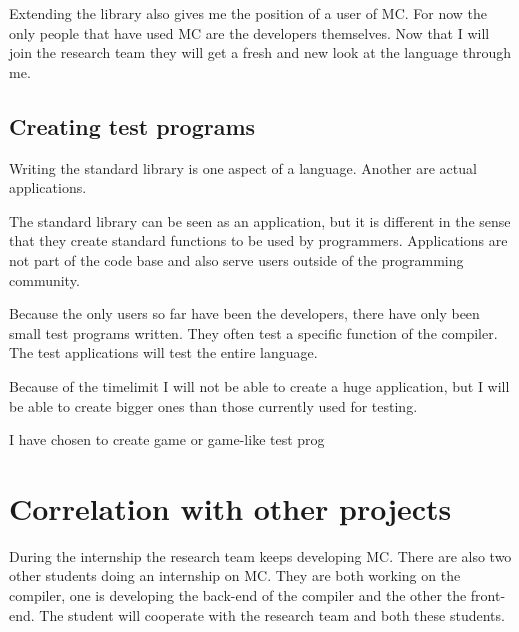 Extending the library also gives me the position of a user of MC.
For now the only people that have used MC are the developers themselves.
Now that I will join the research team they will get a fresh and new look at the language through me.

\subsection{Creating test programs}
Writing the standard library is one aspect of a language.
Another are actual applications.

The standard library can be seen as an application, but it is different in the sense that they create standard functions to be used by programmers.
Applications are not part of the code base and also serve users outside of the programming community.

Because the only users so far have been the developers, there have only been small test programs written.
They often test a specific function of the compiler.
The test applications will test the entire language.

Because of the timelimit I will not be able to create a huge application, but I will be able to create bigger ones than those currently used for testing.

I have chosen to create game or game-like test prog




\section{Correlation with other projects}
During the internship the research team keeps developing MC.
There are also two other students doing an internship on MC.
They are both working on the compiler, one is developing the back-end of the compiler and the other the front-end.
The student will cooperate with the research team and both these students.





